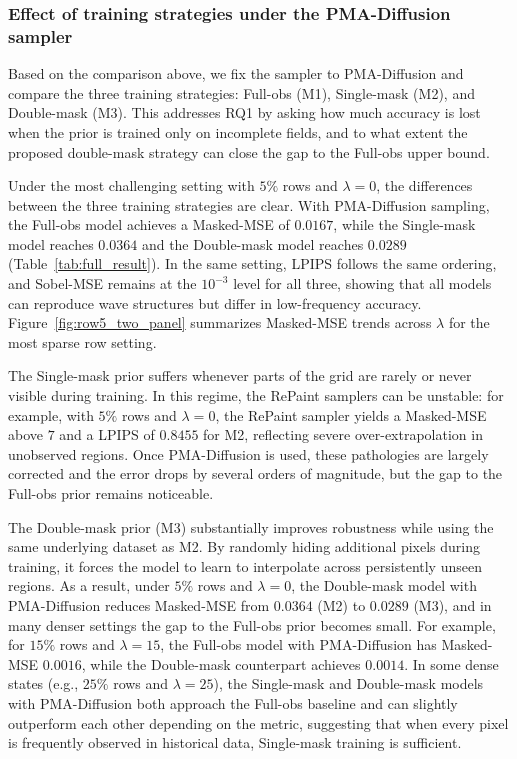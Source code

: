 \documentclass[a4paper,fleqn]{cas-sc}
\numberwithin{equation}{section}
\begin{document}
\subsubsection{Effect of training strategies under the PMA-Diffusion sampler}
\label{sec:exp_training_pma}
Based on the comparison above, we fix the sampler to PMA-Diffusion and compare the three training strategies: Full-obs (M1), Single-mask (M2), and Double-mask (M3). This addresses RQ1 by asking how much accuracy is lost when the prior is trained only on incomplete fields, and to what extent the proposed double-mask strategy can close the gap to the Full-obs upper bound.

Under the most challenging setting with $5\%$ rows and $\lambda=0$, the differences between the three training strategies are clear. With PMA-Diffusion sampling, the Full-obs model achieves a Masked-MSE of $0.0167$, while the Single-mask model reaches $0.0364$ and the Double-mask model reaches $0.0289$ (Table~\ref{tab:full_result}). In the same setting, LPIPS follows the same ordering, and Sobel-MSE remains at the $10^{-3}$ level for all three, showing that all models can reproduce wave structures but differ in low-frequency accuracy. Figure~\ref{fig:row5_two_panel} summarizes Masked-MSE trends across $\lambda$ for the most sparse row setting.

The Single-mask prior suffers whenever parts of the grid are rarely or never visible during training. In this regime, the RePaint samplers can be unstable: for example, with $5\%$ rows and $\lambda=0$, the RePaint sampler yields a Masked-MSE above $7$ and a LPIPS of $0.8455$ for M2, reflecting severe over-extrapolation in unobserved regions. Once PMA-Diffusion is used, these pathologies are largely corrected and the error drops by several orders of magnitude, but the gap to the Full-obs prior remains noticeable.

The Double-mask prior (M3) substantially improves robustness while using the same underlying dataset as M2. By randomly hiding additional pixels during training, it forces the model to learn to interpolate across persistently unseen regions. As a result, under $5\%$ rows and $\lambda=0$, the Double-mask model with PMA-Diffusion reduces Masked-MSE from $0.0364$ (M2) to $0.0289$ (M3), and in many denser settings the gap to the Full-obs prior becomes small. For example, for $15\%$ rows and $\lambda=15$, the Full-obs model with PMA-Diffusion has Masked-MSE $0.0016$, while the Double-mask counterpart achieves $0.0014$. In some dense states (e.g., $25\%$ rows and $\lambda=25$), the Single-mask and Double-mask models with PMA-Diffusion both approach the Full-obs baseline and can slightly outperform each other depending on the metric, suggesting that when every pixel is frequently observed in historical data, Single-mask training is sufficient.
\end{document}
